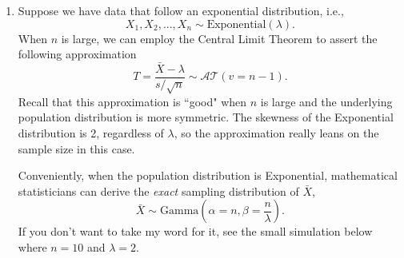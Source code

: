 \documentclass{article}\usepackage[]{graphicx}\usepackage[]{xcolor}
\makeatletter
\newcommand{\hlnum}[1]{\textcolor[rgb]{0.686,0.059,0.569}{#1}}%
\newcommand{\hlopt}[1]{\textcolor[rgb]{0,0,0}{#1}}%
\newcommand{\hldef}[1]{\textcolor[rgb]{0.345,0.345,0.345}{#1}}%
\newcommand{\hlkwb}[1]{\textcolor[rgb]{0.69,0.353,0.396}{#1}}%
\newcommand{\hlkwc}[1]{\textcolor[rgb]{0.333,0.667,0.333}{#1}}%
\newcommand{\hlkwd}[1]{\textcolor[rgb]{0.737,0.353,0.396}{\textbf{#1}}}%
\newenvironment{kframe}{%
 \def\at@end@of@kframe{}%
 \ifinner\ifhmode%
  \def\at@end@of@kframe{\end{minipage}}%
  \begin{minipage}{\columnwidth}%
 \fi\fi%
 \def\FrameCommand##1{\hskip\@totalleftmargin \hskip-\fboxsep
 \colorbox{shadecolor}{##1}\hskip-\fboxsep
     \hskip-\linewidth \hskip-\@totalleftmargin \hskip\columnwidth}%
 \MakeFramed {\advance\hsize-\width
   \@totalleftmargin\z@ \linewidth\hsize
   \@setminipage}}%
 {\par\unskip\endMakeFramed%
 \at@end@of@kframe}
\newenvironment{knitrout}{}{} %
\makeatother
\begin{document}
\begin{enumerate}
\begin{enumerate}
\begin{enumerate}
\begin{knitrout}
\begin{kframe}
\begin{alltt}
      \hldef{(z.stat} \hlkwb{<-} \hldef{(p.hat} \hlopt{-} \hldef{p0)}\hlopt{/}\hlkwd{sqrt}\hldef{(p0}\hlopt{*}\hldef{(}\hlnum{1}\hlopt{-}\hldef{p0)}\hlopt{/}\hldef{n))}
\end{alltt}
\begin{verbatim}
## [1] -1.807392
\end{verbatim}
\begin{alltt}
      \hlkwd{pnorm}\hldef{(}\hlkwc{q} \hldef{= z.stat)}
\end{alltt}
\begin{verbatim}
## [1] 0.03535057
\end{verbatim}
\end{kframe}
\end{knitrout}
      
      \textcolor{red}{The achieved $\alpha$ for this test is approximately 0.035.}
      
      
    \end{enumerate}
  \end{enumerate}
  \item Suppose we have data that follow an exponential distribution, i.e.,
  \[X_1, X_2, ..., X_n \sim \text{Exponential}(\lambda).\]
  When $n$ is large, we can employ the Central Limit Theorem to assert
  the following approximation
  \[T = \frac{\bar{X}-\lambda}{s/\sqrt{n}} \sim \mathcal{AT}(v=n-1).\]
  Recall that this approximation is ``good" when $n$ is large and the underlying 
  population distribution is more symmetric. The skewness of the Exponential 
  distribution is 2, regardless of $\lambda$, so the approximation really leans
  on the sample size in this case.
  
  Conveniently, when the population distribution is Exponential, mathematical 
  statisticians can derive the \emph{exact} sampling distribution of $\bar{X}$,
  \[\bar{X} \sim \textrm{Gamma}\left(\alpha=n, \beta=\frac{n}{\lambda}\right).\]
  If you don't want to take my word for it, see the small simulation below where 
  $n=10$ and $\lambda=2$.



\end{enumerate}
\end{document}

